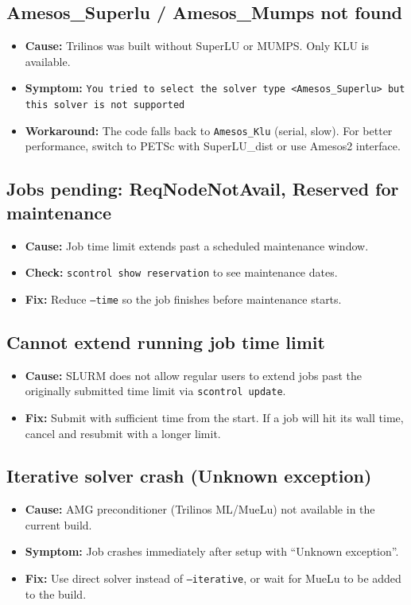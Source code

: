 \documentclass[11pt,a4paper]{article}
\begin{document}
\subsection{Amesos\_Superlu / Amesos\_Mumps not found}
\begin{itemize}
    \item \textbf{Cause:} Trilinos was built without SuperLU or MUMPS. Only KLU is available.
    \item \textbf{Symptom:} \texttt{You tried to select the solver type <Amesos\_Superlu> but this solver is not supported}
    \item \textbf{Workaround:} The code falls back to \texttt{Amesos\_Klu} (serial, slow). For better performance, switch to PETSc with SuperLU\_dist or use Amesos2 interface.
\end{itemize}

\subsection{Jobs pending: ReqNodeNotAvail, Reserved for maintenance}
\begin{itemize}
    \item \textbf{Cause:} Job time limit extends past a scheduled maintenance window.
    \item \textbf{Check:} \texttt{scontrol show reservation} to see maintenance dates.
    \item \textbf{Fix:} Reduce \texttt{--time} so the job finishes before maintenance starts.
\end{itemize}

\subsection{Cannot extend running job time limit}
\begin{itemize}
    \item \textbf{Cause:} SLURM does not allow regular users to extend jobs past the originally submitted time limit via \texttt{scontrol update}.
    \item \textbf{Fix:} Submit with sufficient time from the start. If a job will hit its wall time, cancel and resubmit with a longer limit.
\end{itemize}

\subsection{Iterative solver crash (Unknown exception)}
\begin{itemize}
    \item \textbf{Cause:} AMG preconditioner (Trilinos ML/MueLu) not available in the current build.
    \item \textbf{Symptom:} Job crashes immediately after setup with ``Unknown exception''.
    \item \textbf{Fix:} Use direct solver instead of \texttt{--iterative}, or wait for MueLu to be added to the build.
\end{itemize}
\end{document}
